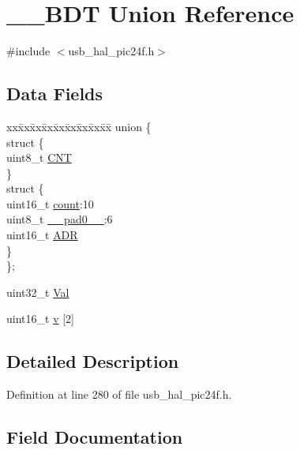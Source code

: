 \hypertarget{union_____b_d_t}{}\section{\+\_\+\+\_\+\+B\+DT Union Reference}
\label{union_____b_d_t}


{\ttfamily \#include $<$usb\+\_\+hal\+\_\+pic24f.\+h$>$}

\subsection*{Data Fields}
\begin{DoxyCompactItemize}
\item 
\begin{tabbing}
xx\=xx\=xx\=xx\=xx\=xx\=xx\=xx\=xx\=\kill
union \{\\
\>struct \{\\
\>\>uint8\_t \mbox{\hyperlink{union_____b_d_t_a8dcbbc96a681e9aec7bcee3ba3a93254}{CNT}}\\
\>\} \\
\>struct \{\\
\>\>uint16\_t \mbox{\hyperlink{union_____b_d_t_af6a39bfc7e1dc3b6f9c997c1c43fa996}{count}}:10\\
\>\>uint8\_t \mbox{\hyperlink{union_____b_d_t_a8b4eebe79ded0459acec2f4950102ba3}{\_\_pad0\_\_}}:6\\
\>\>uint16\_t \mbox{\hyperlink{union_____b_d_t_abb5ea3cb20903a76af1e03bb35b36d29}{ADR}}\\
\>\} \\
\}; \\

\end{tabbing}\item 
uint32\+\_\+t \mbox{\hyperlink{union_____b_d_t_a4497b7ccdd35adfe3656ecc961faad01}{Val}}
\item 
uint16\+\_\+t \mbox{\hyperlink{union_____b_d_t_ad3333479e5f03245d832c5d7e29f313f}{v}} \mbox{[}2\mbox{]}
\end{DoxyCompactItemize}


\subsection{Detailed Description}


Definition at line 280 of file usb\+\_\+hal\+\_\+pic24f.\+h.



\subsection{Field Documentation}
\mbox{\label{union_____b_d_t_a479bc83c89dbfe6e2997a017048361f6}} 
